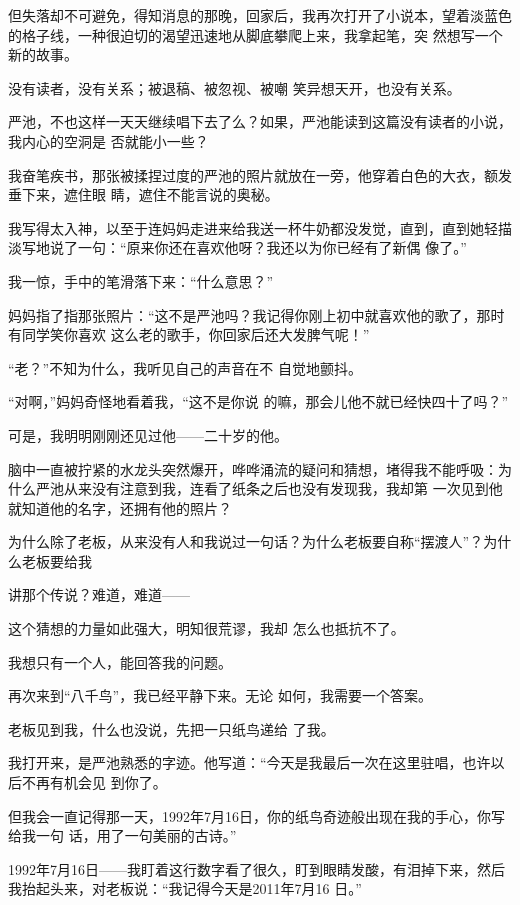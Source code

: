 \documentclass{article}
\begin{document}
\newpage

但失落却不可避免，得知消息的那晚，回家后，我再次打开了小说本，望着淡蓝色的格子线，一种很迫切的渴望迅速地从脚底攀爬上来，我拿起笔，突
然想写一个新的故事。 

没有读者，没有关系；被退稿、被忽视、被嘲
笑异想天开，也没有关系。 

严池，不也这样一天天继续唱下去了么？如果，严池能读到这篇没有读者的小说，我内心的空洞是
否就能小一些？ 

我奋笔疾书，那张被揉捏过度的严池的照片就放在一旁，他穿着白色的大衣，额发垂下来，遮住眼
睛，遮住不能言说的奥秘。 

我写得太入神，以至于连妈妈走进来给我送一杯牛奶都没发觉，直到，直到她轻描淡写地说了一句：“原来你还在喜欢他呀？我还以为你已经有了新偶
像了。” 

\newpage

我一惊，手中的笔滑落下来：“什么意思？”

妈妈指了指那张照片：“这不是严池吗？我记得你刚上初中就喜欢他的歌了，那时有同学笑你喜欢
这么老的歌手，你回家后还大发脾气呢！” 

“老？”不知为什么，我听见自己的声音在不
自觉地颤抖。 

“对啊，”妈妈奇怪地看着我，“这不是你说
的嘛，那会儿他不就已经快四十了吗？” 

可是，我明明刚刚还见过他——二十岁的他。

脑中一直被拧紧的水龙头突然爆开，哗哗涌流的疑问和猜想，堵得我不能呼吸：为什么严池从来没有注意到我，连看了纸条之后也没有发现我，我却第
一次见到他就知道他的名字，还拥有他的照片？ 

为什么除了老板，从来没有人和我说过一句话？为什么老板要自称“摆渡人”？为什么老板要给我
\newpage

讲那个传说？难道，难道—— 

这个猜想的力量如此强大，明知很荒谬，我却
怎么也抵抗不了。 


我想只有一个人，能回答我的问题。 

再次来到“八千鸟”，我已经平静下来。无论
如何，我需要一个答案。 

老板见到我，什么也没说，先把一只纸鸟递给
了我。 

我打开来，是严池熟悉的字迹。他写道：“今天是我最后一次在这里驻唱，也许以后不再有机会见
到你了。 

但我会一直记得那一天，1992年7月16日，你的纸鸟奇迹般出现在我的手心，你写给我一句
话，用了一句美丽的古诗。” 

\newpage

1992年7月16日——我盯着这行数字看了很久，盯到眼睛发酸，有泪掉下来，然后我抬起头来，对老板说：“我记得今天是2011年7月16
日。” 
\end{document}
